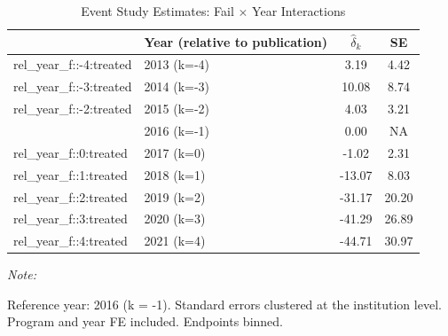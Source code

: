 \begin{table}[!h]
\centering
\caption{Event Study Estimates: Fail $\times$ Year Interactions\label{tab:eventstudy}}
\centering
\begin{threeparttable}
\begin{tabular}[t]{llcc}
\toprule
  & Year (relative to publication) & $\hat{\delta}_k$ & SE\\
\midrule
rel_year_f::-4:treated & 2013 (k=-4) & 3.19 & 4.42\\
rel_year_f::-3:treated & 2014 (k=-3) & 10.08 & 8.74\\
rel_year_f::-2:treated & 2015 (k=-2) & 4.03 & 3.21\\
 & 2016 (k=-1) & 0.00 & NA\\
rel_year_f::0:treated & 2017 (k=0) & -1.02 & 2.31\\
\addlinespace
rel_year_f::1:treated & 2018 (k=1) & -13.07 & 8.03\\
rel_year_f::2:treated & 2019 (k=2) & -31.17 & 20.20\\
rel_year_f::3:treated & 2020 (k=3) & -41.29 & 26.89\\
rel_year_f::4:treated & 2021 (k=4) & -44.71 & 30.97\\
\bottomrule
\end{tabular}
\begin{tablenotes}
\item \textit{Note: } 
\item Reference year: 2016 (k = -1). Standard errors clustered at the institution level. Program and year FE included. Endpoints binned.
\end{tablenotes}
\end{threeparttable}
\end{table}
